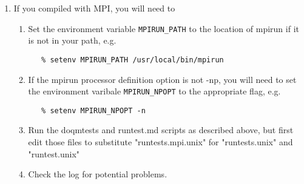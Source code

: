 \begin{enumerate}
\item If you compiled with MPI, you will need to
   \begin{enumerate}
   \item Set the environment variable \verb+MPIRUN_PATH+ to the location of mpirun
      if it is not in your path, e.g.
   \begin{verbatim}
   % setenv MPIRUN_PATH /usr/local/bin/mpirun
   \end{verbatim}
   \item If the mpirun processor definition option is not -np, you will need
      to set the environment varibale \verb+MPIRUN_NPOPT+ to the appropriate
      flag, e.g.
   \begin{verbatim}
   % setenv MPIRUN_NPOPT -n
   \end{verbatim}
   \item Run the doqmtests and runtest.md scripts as described above, but first
      edit those files to substitute "runtests.mpi.unix" for "runtests.unix"
      and "runtest.unix"
   \item Check the log for potential problems.
   \end{enumerate}
\end{enumerate}
